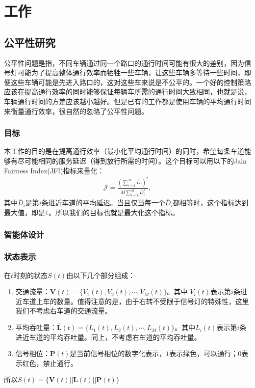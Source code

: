 
\chapter{工作}

\section{公平性研究}
公平性问题是指，不同车辆通过同一个路口的通行时间可能有很大的差别，因为信号灯可能为了提高整体通行效率而牺牲一些车辆，让这些车辆多等待一些时间，即便这些车辆可能是先进入路口的，这对这些车来说是不公平的。一个好的控制策略应该在提高通行效率的同时能够保证每辆车所需的通行时间大致相同，也就是说，车辆通行时间的方差应该越小越好。但是已有的工作都是使用车辆的平均通行时间来衡量通行效率，很自然的忽略了公平性问题。
\subsection{目标}
本工作的目的是在提高通行效率（最小化平均通行时间）的同时，希望每条车道能够有尽可能相同的服务延迟（得到放行所需的时间）。这个目标可以用以下的Jain Fairness Index(JFI)指标来量化：
\begin{align}
    \mathcal{J} = \frac{(\sum_{i=1}^{M}\overline{D}_i)^2}{M\sum_{i=1}^{M}\overline{D}_i^2},
\end{align}
其中$\overline{D}_i$是第$i$条进近车道的平均延迟。当且仅当每一个$\overline{D}_i$都相等时，这个指标达到最大值，即是$1$。所以我们的目标也就是最大化这个指标。

\subsection{智能体设计}
\subsection*{状态表示}
在$t$时刻的状态$S(t)$由以下几个部分组成：
\begin{enumerate}
\item 交通流量：$\boldsymbol{V}(t)=\{V_1(t),V_2(t),\cdots,V_M(t)\}$。其中 $V_i(t)$表示第$i$条进近车道上车的数量。值得注意的是，由于右转不受限于信号灯的特殊性，这里我们不考虑右车道的交通流量。
\item 平均吞吐量：$\boldsymbol{\overline{L}}(t)=\{\overline{L}_1(t),\overline{L}_2(t),\cdots,\overline{L}_M(t)\}$。其中$\overline{L}_i(t)$表示第$i$条进近车道的平均吞吐量。同上，不考虑右车道的平均吞吐量。
\item 信号相位：$\boldsymbol{P}(t)$是当前信号相位的数字化表示，$1$表示绿色，可以通行；$0$表示红色，禁止通行。
\end{enumerate}
所以$S(t)=\{\boldsymbol{V}(t) || \boldsymbol{\overline{L}}(t) || \boldsymbol{P}(t) \}$
